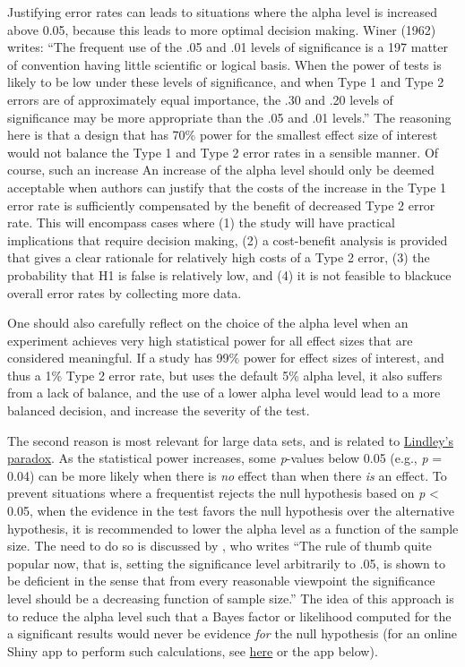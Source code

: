 \documentclass[
]{krantz}
\begin{document}
Justifying error rates can leads to situations where the alpha level is increased above 0.05, because this leads to more optimal decision making. Winer (1962) writes: ``The frequent use of the .05 and .01 levels of significance is a
197 matter of convention having little scientific or logical basis. When the power of tests is likely to be low under these levels of significance, and when Type 1 and Type 2 errors are of approximately equal importance, the .30 and .20 levels of significance may be more appropriate than the .05 and .01 levels.'' The reasoning here is that a design that has 70\% power for the smallest effect size of interest would not balance the Type 1 and Type 2 error rates in a sensible manner. Of course, such an increase An increase of the alpha level should only be deemed acceptable when authors can justify that the costs of the increase in the Type 1 error rate is sufficiently compensated by the benefit of decreased Type 2 error rate. This will encompass cases where (1) the study will have practical implications that require decision making, (2) a cost-benefit analysis is provided that gives a clear rationale for relatively high costs of a Type 2 error, (3) the probability that H1 is false is relatively low, and (4) it is not feasible to blackuce overall error rates by collecting more data.

One should also carefully reflect on the choice of the alpha level when an experiment achieves very high statistical power for all effect sizes that are considered meaningful. If a study has 99\% power for effect sizes of interest, and thus a 1\% Type 2 error rate, but uses the default 5\% alpha level, it also suffers from a lack of balance, and the use of a lower alpha level would lead to a more balanced decision, and increase the severity of the test.

The second reason is most relevant for large data sets, and is related to \protect\hyperlink{lindley}{Lindley's paradox}. As the statistical power increases, some \emph{p}-values below 0.05 (e.g., \emph{p} = 0.04) can be more likely when there is \emph{no} effect than when there \emph{is} an effect. To prevent situations where a frequentist rejects the null hypothesis based on \emph{p} \textless{} 0.05, when the evidence in the test favors the null hypothesis over the alternative hypothesis, it is recommended to lower the alpha level as a function of the sample size. The need to do so is discussed by \citet{leamer_specification_1978}, who writes ``The rule of thumb quite popular now, that is, setting the significance level arbitrarily to .05, is shown to be deficient in the sense that from every reasonable viewpoint the significance level should be a decreasing function of sample size.'' The idea of this approach is to reduce the alpha level such that a Bayes factor or likelihood computed for the a significant results would never be evidence \emph{for} the null hypothesis (for an online Shiny app to perform such calculations, see \href{https://shiny.ieis.tue.nl/JustifyAlpha/}{here} or the app below).
\end{document}

